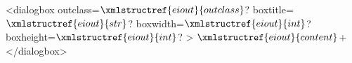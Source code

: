 <dialogbox outclass=$\xmlstructref{eiout}{outclass}$? boxtitle=$\xmlstructref{eiout}{str}$? boxwidth=$\xmlstructref{eiout}{int}$? boxheight=$\xmlstructref{eiout}{int}$? >
  $\xmlstructref{eiout}{content}$+
</dialogbox>
